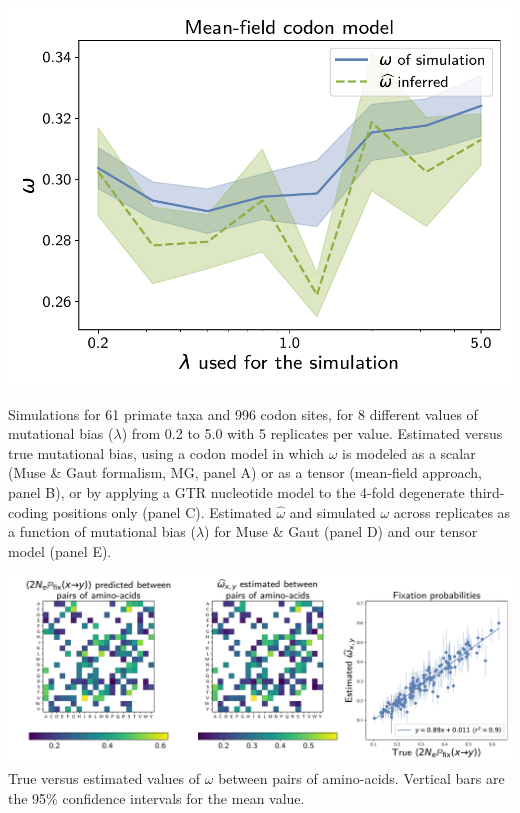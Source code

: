 \documentclass{article}
\begin{document}
\begin{center}
    \begin{minipage}{0.325\linewidth}
        \includegraphics[width=\linewidth, page=1]{inference_supp_mat/PrimatesExons2Mu1.0_omega_MF.pdf}
    \end{minipage}
\end{center}
Simulations for 61 primate taxa and 996 codon sites, for 8 different values of mutational bias ($\lambda$) from 0.2 to 5.0 with 5 replicates per value.
Estimated versus true mutational bias, using a codon model in which $\omega$ is modeled as a scalar (Muse \& Gaut formalism, MG, panel A) or as a tensor (mean-field approach, panel B), or by applying a GTR nucleotide model to the 4-fold degenerate third-coding positions only (panel C).
Estimated $\hat{\omega}$ and simulated $\omega$ across replicates as a function of mutational bias ($\lambda$) for Muse \& Gaut (panel D) and our tensor model (panel E).

\includegraphics[width=\linewidth, page=1]{inference_supp_mat/PrimatesExons2Mu1.0_omega_pair_MF.pdf}
True versus estimated values of $\omega$ between pairs of amino-acids.
Vertical bars are the 95\% confidence intervals for the mean value.
\end{document}
